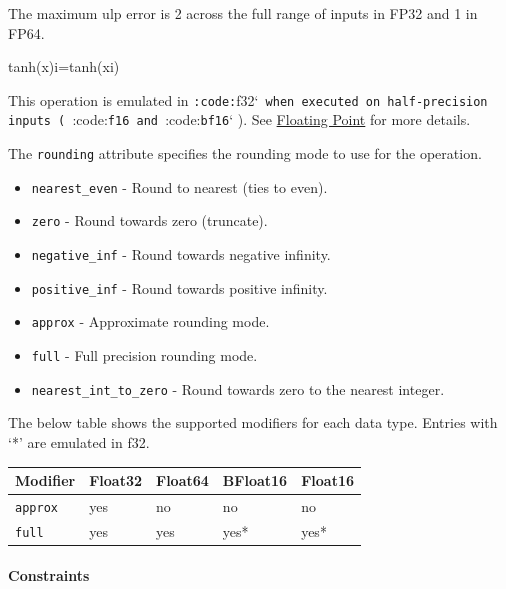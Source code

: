 \documentclass{article}
\begin{document}
The maximum ulp error is 2 across the full range of inputs in FP32 and 1 in FP64.


tanh(x)i=tanh(xi)

This operation is emulated in \texttt{:code:}f32`\texttt{ when executed on half-precision inputs ( }:code:\texttt{f16}\texttt{ and }:code:\texttt{bf16}` ). See \href{https://docs.nvidia.com/cuda/tile-ir/latest/sections/operations.html#op-group-floating-point}{Floating Point} for more details.


The \texttt{rounding} attribute specifies the rounding mode to use for the operation.


\begin{itemize}
\item \texttt{nearest\_even} - Round to nearest (ties to even).
\item \texttt{zero} - Round towards zero (truncate).
\item \texttt{negative\_inf} - Round towards negative infinity.
\item \texttt{positive\_inf} - Round towards positive infinity.
\item \texttt{approx} - Approximate rounding mode.
\item \texttt{full} - Full precision rounding mode.
\item \texttt{nearest\_int\_to\_zero} - Round towards zero to the nearest integer.

\end{itemize}
The below table shows the supported modifiers for each data type. Entries with `*' are emulated in f32.


\begin{longtable}{l|l|l|l|l}
\hline
Modifier & Float32 & Float64 & BFloat16 & Float16 \\ \hline
\texttt{approx} & yes & no & no & no \\ \hline
\texttt{full} & yes & yes & yes* & yes* \\ \hline
\end{longtable}


\paragraph{Constraints}
\end{document}
